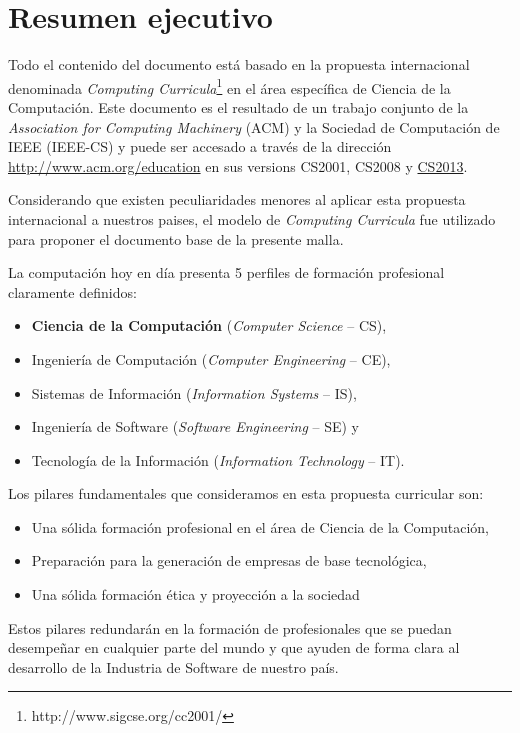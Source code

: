 \chapter*{Resumen ejecutivo}
\AbstractIntro

Todo el contenido del documento está basado en la propuesta internacional denominada \textit{Computing Curricula}\footnote{http://www.sigcse.org/cc2001/} 
en el área especí­fica de Ciencia de la Computación. Este documento es el resultado de un trabajo conjunto de la 
\textit{Association for Computing Machinery} (ACM) y la Sociedad de Computación de IEEE (IEEE-CS) y 
puede ser accesado a través de la dirección \href{http://www.acm.org/education}{http://www.acm.org/education} 
en sus versions CS2001, CS2008 y \href{cs2013.org}{CS2013}.

Considerando que existen peculiaridades menores al aplicar esta propuesta internacional a nuestros paises, el modelo de \textit{Computing Curricula} 
fue utilizado para proponer el documento base de la presente malla. 

\noindent La computación hoy en dí­a presenta 5 perfiles de formación profesional claramente definidos: 
\begin{itemize}
\item \textbf{Ciencia de la Computación} (\textit{Computer Science} -- CS),
\item Ingenierí­a de Computación (\textit{Computer Engineering} -- CE),
\item Sistemas de Información (\textit{Information Systems} -- IS),
\item Ingenierí­a de Software (\textit{Software Engineering} -- SE) y 
\item Tecnologí­a de la Información (\textit{Information Technology} -- IT).
\end{itemize}

Los pilares fundamentales que consideramos en esta propuesta curricular son:
\begin{itemize}
\item Una sólida formación profesional en el área de Ciencia de la Computación,
\item Preparación para la generación de empresas de base tecnológica,
\item Una sólida formación ética y proyección a la sociedad
\end{itemize}

Estos pilares redundarán en la formación de profesionales que se puedan desempeñar en 
cualquier parte del mundo y que ayuden de forma clara al desarrollo de la Industria 
de Software de nuestro paí­s. 

